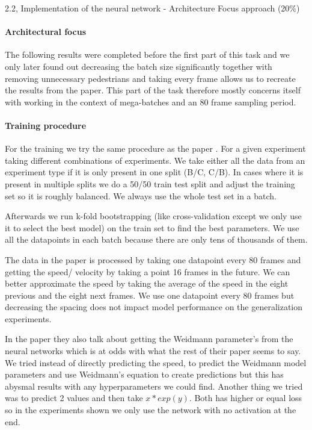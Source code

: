 \begin{task}{2.2, Implementation of the neural network - Architecture Focus approach (20\%)}

\paragraph{Architectural focus}
The following results were completed before the first part of this task and we only later found out decreasing the batch size significantly together with removing unnecessary pedestrians and taking every frame allows us to recreate the results from the paper. This part of the task therefore mostly concerns itself with working in the context of mega-batches and an 80 frame sampling period.

\paragraph{Training procedure}
For the training we try the same procedure as the paper \cite{tordeux2020prediction}. For a given experiment taking different combinations of experiments. We take either all the data from an experiment type if it is only present in one split (B/C, C/B). In cases where it is present in multiple splits we do a 50/50 train test split and adjust the training set so it is roughly balanced. We always use the whole test set in a batch.

Afterwards we run k-fold bootstrapping (like cross-validation except we only use it to select the best model) on the train set to find the best parameters. We use all the datapoints in each batch because there are only tens of thousands of them.

The data in the paper is processed by taking one datapoint every 80 frames and getting the speed/ velocity by taking a point 16 frames in the future. We can better approximate the speed by taking the average of the speed in the eight previous and the eight next frames. We use one datapoint every 80 frames but decreasing the spacing does not impact model performance on the generalization experiments.

In  the paper they also talk about getting the Weidmann parameter's from the neural networks which is at odds with what the rest of their paper seems to say. We tried instead of directly predicting the speed, to predict the Weidmann model parameters and use Weidmann's equation to create predictions but this has abysmal results with any hyperparameters we could find. Another thing we tried was to predict 2 values and then take $x * exp(y)$. Both has higher or equal loss so in the experiments shown we only use the network with no activation at the end.


\end{task}
